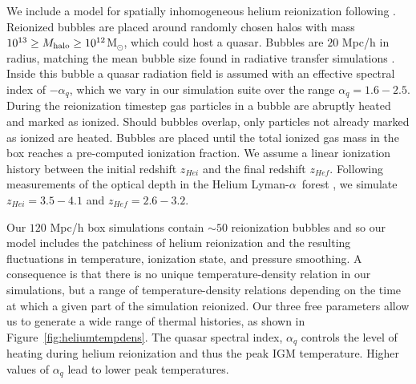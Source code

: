 \documentclass[a4paper,11pt]{article}
\newcommand{\Lya}{Lyman-$\alpha$}
\begin{document}
We include a model for spatially inhomogeneous helium reionization following \cite{UptonSanderbeck:2020}. Reionized bubbles are placed around randomly chosen halos with mass $10^{13} \geq M_{\rm halo}\geq 10^{12}$M$_{\odot}$, which could host a quasar. Bubbles are $20$ Mpc/h in radius, matching the mean bubble size found in radiative transfer simulations \citep{McQuinn:2009}. Inside this bubble a quasar radiation field is assumed with an effective spectral index of $- \alpha_q$, which we vary in our simulation suite over the range $\alpha_q  = 1.6 - 2.5$. During the reionization timestep gas particles in a bubble are abruptly heated and marked as ionized. Should bubbles overlap, only particles not already marked as ionized are heated. Bubbles are placed until the total ionized gas mass in the box reaches
a pre-computed ionization fraction. We assume a linear ionization history between the initial redshift $z_{Hei}$ and the final redshift $z_{Hef}$. Following measurements of the optical depth in the Helium \Lya~forest \cite{Worseck:2019}, we simulate $z_{Hei} = 3.5 -  4.1$ and $z_{Hef} = 2.6 - 3.2$.

Our $120$ Mpc/h box simulations contain $\sim 50$ reionization bubbles and so our model includes the patchiness of helium reionization and the resulting fluctuations in temperature, ionization state, and pressure smoothing. A consequence is that there is no unique temperature-density relation in our simulations, but a range of temperature-density relations depending on the time at which a given part of the simulation reionized. Our three free parameters allow us to generate a wide range of thermal histories, as shown in Figure~\ref{fig:heliumtempdens}. The quasar spectral index, $\alpha_q$ controls the level of heating during helium reionization and thus the peak IGM temperature. Higher values of $\alpha_q$ lead to lower peak temperatures.

\end{document}
